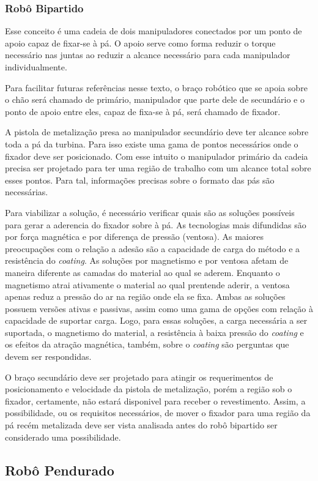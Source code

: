 \subsubsection{Robô Bipartido}

Esse conceito é uma cadeia de dois manipuladores conectados por um ponto de
apoio capaz de fixar-se à pá. O apoio serve como forma reduzir o torque
necessário nas juntas ao reduzir a alcance necessário para cada manipulador
individualmente.

Para facilitar futuras referências nesse texto, o braço robótico que se
apoia sobre o chão será chamado de primário, manipulador que parte dele de
secundário e o ponto de apoio entre eles, capaz de fixa-se à pá, será chamado de
fixador.

A pistola de metalização presa ao manipulador secundário deve ter
alcance sobre toda a pá da turbina. Para isso existe uma gama de pontos
necessários onde o fixador deve ser posicionado. Com esse intuito o
manipulador primário da cadeia precisa ser projetado para ter uma região de
trabalho com um alcance total sobre esses pontos. Para tal, informações precisas
sobre o formato das pás são necessárias.

Para viabilizar a solução, é necessário verificar quais são as soluções
possíveis para gerar a aderencia do fixador sobre à pá. As tecnologias mais
difundidas são por força magnética e por diferença de pressão (ventosa).
As maiores preocupações com o relação a adesão são a capacidade de carga do
método e a resistência do \textit{coating}. As soluções por magnetismo e
por ventosa afetam de maneira diferente as camadas do material ao qual se
aderem. Enquanto o magnetismo atrai ativamente o material ao qual prentende
aderir, a ventosa apenas reduz a pressão do ar na região onde ela se fixa. Ambas
as soluções possuem versões ativas e passivas, assim como uma gama de opções com
relação à capacidade de suportar carga. Logo, para essas soluções, a carga
necessária a ser suportada, o magnetismo do material, a resistência à baixa
pressão do \textit{coating} e os efeitos da atração magnética, também, sobre o
\textit{coating} são perguntas que devem ser respondidas.

O braço secundário deve ser projetado para atingir os requerimentos de
posicionamento e velocidade da pistola de metalização, porém a região sob o
fixador, certamente, não estará disponivel para receber o revestimento. Assim, a
possibilidade, ou os requisitos necessários, de mover o fixador para uma região
da pá recém metalizada deve ser vista analisada antes do robô bipartido ser
considerado uma possibilidade.

\subsection{Robô Pendurado} 
